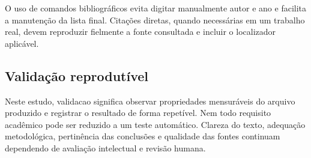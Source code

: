 O uso de comandos bibliográficos evita digitar manualmente autor e ano e facilita a manutenção da lista final. Citações diretas, quando necessárias em um trabalho real, devem reproduzir fielmente a fonte consultada e incluir o localizador aplicável.

\subsection{Validação reprodutível}

Neste estudo, \gls{validacao} significa observar propriedades mensuráveis do arquivo produzido e registrar o resultado de forma repetível. Nem todo requisito acadêmico pode ser reduzido a um teste automático. Clareza do texto, adequação metodológica, pertinência das conclusões e qualidade das fontes continuam dependendo de avaliação intelectual e revisão humana.
